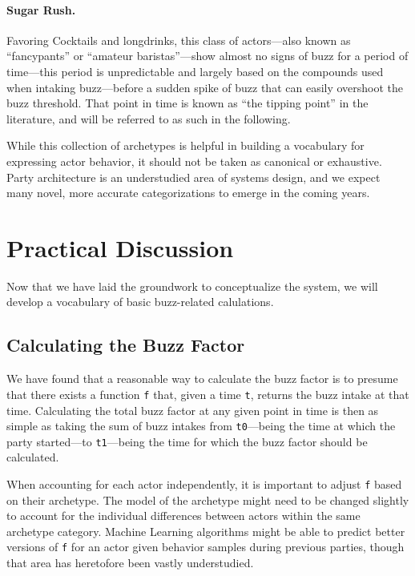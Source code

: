 \documentclass[twocolumn]{article}
\begin{document}
\paragraph{Sugar Rush.} Favoring Cocktails and longdrinks, this class of
actors—also known as “fancypants” or “amateur baristas”—show almost no signs of
buzz for a period of time—this period is unpredictable and largely based on the
compounds used when intaking buzz—before a sudden spike of buzz that can easily
overshoot the buzz threshold. That point in time is known as “the tipping point”
in the literature, and will be referred to as such in the following.

\bigskip

While this collection of archetypes is helpful in building a vocabulary for
expressing actor behavior, it should not be taken as canonical or exhaustive.
Party architecture is an understudied area of systems design, and we expect many
novel, more accurate categorizations to emerge in the coming years.

\section{Practical Discussion}

Now that we have laid the groundwork to conceptualize the system, we will
develop a vocabulary of basic buzz-related calulations.

\subsection{Calculating the Buzz Factor}

We have found that a reasonable way to calculate the buzz factor is to presume
that there exists a function \texttt{f} that, given a time \texttt{t}, returns
the buzz intake at that time. Calculating the total buzz factor at any given
point in time is then as simple as taking the sum of buzz intakes from
\texttt{t0}—being the time at which the party started—to \texttt{t1}—being the
time for which the buzz factor should be calculated.

When accounting for each actor independently, it is important to adjust \texttt{f} based on their archetype. The model of the archetype might need to
be changed slightly to account for the individual differences between actors
within the same archetype category. Machine Learning algorithms might be able
to predict better versions of \texttt{f} for an actor given behavior samples
during previous parties, though that area has heretofore been vastly
understudied.
\end{document}

